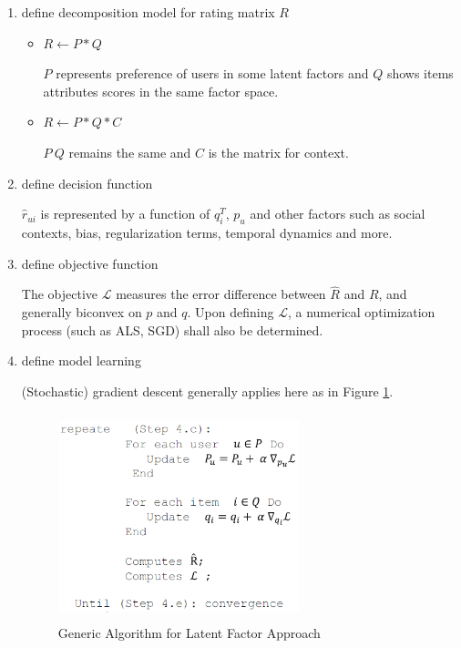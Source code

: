 \documentclass[letter paper, 11pt]{article}
\begin{document}
	\begin{enumerate}
		\item define decomposition model for rating matrix $R$
		
		\begin{itemize}
			\item $ R \leftarrow P * Q $ 
			
			$P$ represents preference of users in some latent factors and $Q$ shows items attributes scores in the same factor space.
			
			\item $ R \leftarrow P * Q * C$
			
			$P\ Q$ remains the same and $C$ is the matrix for context.
		\end{itemize}
		
		\item define decision function
		
		$\hat{r}_{ui}$ is represented by a function of $q_i^T$, $p_u$ and other factors such as social contexts, bias, regularization terms, temporal dynamics and more.
		
		
		\item define objective function
		
		The objective $\mathcal{L}$ measures the error difference between $\hat{R}$ and $R$, and generally biconvex on $p$ and $q$. Upon defining $\mathcal{L}$, a numerical optimization process (such as ALS, SGD) shall also be determined.
		
		\item define model learning
		
		(Stochastic) gradient descent generally applies here as in Figure \ref{fig:generic}. 
		\begin{figure}[h]
			\caption{Generic Algorithm for Latent Factor Approach\cite{latentFactor-RS}}
			\label{fig:generic}
			\centering
			\includegraphics[width=7cm, height=6cm]{Latent-factor-Framework1.png}
		\end{figure}
		
	\end{enumerate}
\end{document}
